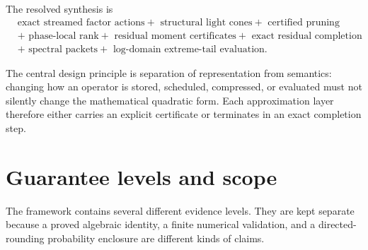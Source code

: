 \documentclass[11pt]{article}
\theoremstyle{definition}
\theoremstyle{remark}
\begin{document}
The resolved synthesis is
\[
\boxed{\begin{aligned}
&\text{exact streamed factor actions}
+\text{ structural light cones}
+\text{ certified pruning}\\
&+\text{ phase-local rank}
+\text{ residual moment certificates}
+\text{ exact residual completion}\\
&+\text{ spectral packets}
+\text{ log-domain extreme-tail evaluation}.
\end{aligned}}
\]

The central design principle is separation of representation from semantics:
changing how an operator is stored, scheduled, compressed, or evaluated must
not silently change the mathematical quadratic form.  Each approximation
layer therefore either carries an explicit certificate or terminates in an
exact completion step.

\section{Guarantee levels and scope}

The framework contains several different evidence levels.  They are kept
separate because a proved algebraic identity, a finite numerical validation,
and a directed-rounding probability enclosure are different kinds of claims.
\end{document}
